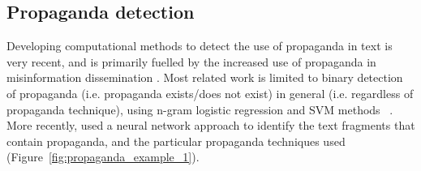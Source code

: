\subsection{Propaganda detection}
\label{ssec:lit_propaganda_detection}




Developing computational methods to detect the use of propaganda in text is very recent, and is primarily fuelled by the increased use of propaganda in misinformation dissemination \cite{da2020survey}. Most related work is limited to binary detection of propaganda (i.e. propaganda exists/does not exist) in general (i.e. regardless of propaganda technique), using n-gram logistic regression and SVM methods ~\cite{rashkin2017truth,barron2019proppy}. More recently, \citet{da2019fine} used a neural network approach to identify the text fragments that contain propaganda, and the particular propaganda techniques used (Figure~\ref{fig:propaganda_example_1}).






